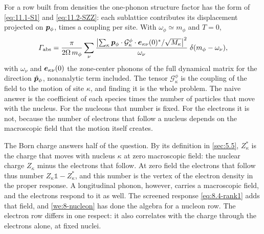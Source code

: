 For a row built from densities the one-phonon structure factor has the form of \cref{eq:11.1-S1} and \cref{eq:11.2-SZZ}: each sublattice contributes its displacement projected on $\bm{p}_\phi$, times a coupling per site. With $\omega_\phi \simeq m_\phi$ and $T = 0$,
\begin{equation}
  \varGamma_{\mathrm{abs}} = \frac{\pi}{2\Omega\,m_\phi}\sum_\nu\frac{\bigl|\sum_\kappa\bm{p}_\phi\cdot\mathcal{G}^\phi_\kappa\cdot\bm{e}_{\kappa\nu}(0)^*/\sqrt{M_\kappa}\bigr|^2}{\omega_\nu}\;\delta(m_\phi - \omega_\nu) ,
  \label{eq:11.8-Gamma}
\end{equation}
with $\omega_\nu$ and $\bm{e}_{\kappa\nu}(0)$ the zone-center phonons of the full dynamical matrix for the direction $\hat{\bm{p}}_\phi$, nonanalytic term included. The tensor $\mathcal{G}^\phi_\kappa$ is the coupling of the field to the motion of site $\kappa$, and finding it is the whole problem. The naive answer is the coefficient of each species times the number of particles that move with the nucleus. For the nucleons that number is fixed. For the electrons it is not, because the number of electrons that follow a nucleus depends on the macroscopic field that the motion itself creates.

The Born charge answers half of the question. By its definition in \cref{sec:5.5}, $Z^*_\kappa$ is the charge that moves with nucleus $\kappa$ at zero macroscopic field: the nuclear charge $Z_\kappa$ minus the electrons that follow. At zero field the electrons that follow thus number $Z_\kappa\mathbb{1} - Z^*_\kappa$, and this number is the vertex of the electron density in the proper response. A longitudinal phonon, however, carries a macroscopic field, and the electrons respond to it as well. The screened response \cref{eq:8.4-rank1} adds that field, and \cref{we:8-nucleon} has done the algebra for a nucleon row. The electron row differs in one respect: it also correlates with the charge through the electrons alone, at fixed nuclei.

